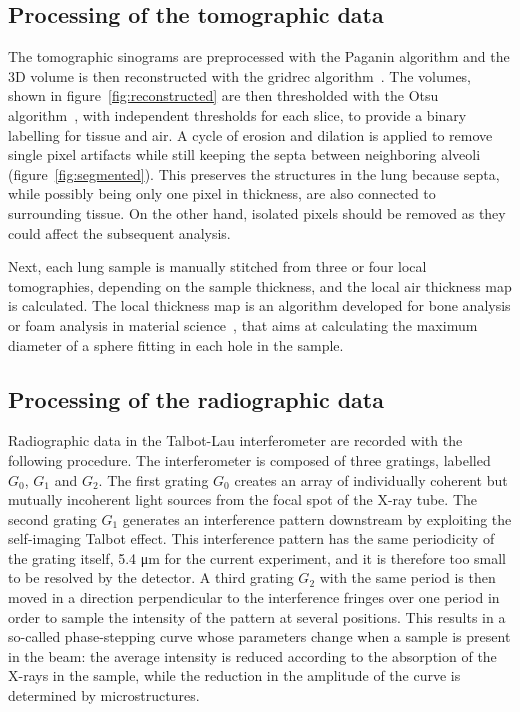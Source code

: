 
\subsection{Processing of the tomographic data}\label{sec:tomoprocessing}
The tomographic sinograms are preprocessed with the Paganin
algorithm and
the 3D volume is then reconstructed with the gridrec
algorithm~\parencite{Marone:pp5022}. The volumes, shown in
figure~\ref{fig:reconstructed} are then thresholded with the Otsu
algorithm~\parencite{Otsu_1979}, with independent thresholds for each slice, to
provide a binary labelling for tissue and air. A cycle of
erosion and dilation is applied to remove single pixel artifacts while still
keeping the septa between neighboring alveoli (figure~\ref{fig:segmented}).
This preserves the structures in the lung because septa, while possibly
being only one pixel in thickness, are also connected to surrounding tissue.
On the other hand, isolated pixels should be removed as they could affect
the subsequent analysis.

Next, each lung sample is manually stitched from three or four local
tomographies, depending on the sample thickness, and the local air thickness
map is calculated. The local thickness map is an algorithm developed for
bone analysis or foam analysis in material science~\cite{Hildebrand_2003}, that aims
at calculating the maximum diameter of a sphere fitting in each hole in the
sample.

\subsection{Processing of the radiographic data}\label{sec:radioprocessing}
Radiographic data in the Talbot-Lau interferometer are recorded with the
following procedure. The interferometer is composed of three gratings,
labelled $G_0$, $G_1$ and $G_2$. The first grating $G_0$ creates an array of
individually coherent but mutually incoherent light sources from the
focal spot of the X-ray tube. The second grating $G_1$ generates an
interference pattern downstream by exploiting the self-imaging Talbot
effect. This interference pattern has the same periodicity of the grating
itself, 5.4 μm for the current experiment, and it is therefore too small to
be resolved by the detector. A third grating $G_2$ with the same period is
then moved in a direction perpendicular to the interference fringes over one
period in order to sample the intensity of the pattern at several positions.
This results in a so-called phase-stepping curve whose parameters change
when a sample is present in the beam: the average intensity is reduced
according to the absorption of the X-rays in the sample, while the reduction
in the amplitude of the curve is determined by microstructures.

